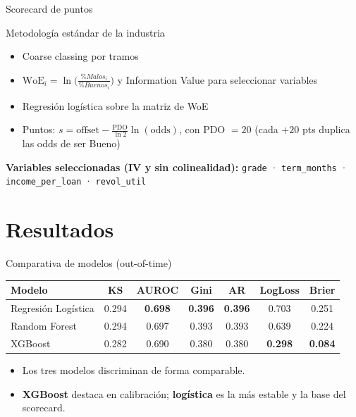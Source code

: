 \documentclass[aspectratio=169, 11pt]{beamer}
\newcommand{\bt}[1]{\textbf{#1}}
\begin{document}
\begin{frame}{Scorecard de puntos}
  \begin{block}{Metodología estándar de la industria}
    \begin{itemize}
      \item Coarse classing por tramos
      \item $\mathrm{WoE}_i = \ln\!\big(\tfrac{\%Malos_i}{\%Buenos_i}\big)$ y
            Information Value para seleccionar variables
      \item Regresión logística sobre la matriz de WoE
      \item Puntos: $s = \text{offset} - \tfrac{\text{PDO}}{\ln 2}
            \ln(\text{odds})$, con PDO $=20$ (cada $+20$ pts duplica las
            odds de ser Bueno)
    \end{itemize}
  \end{block}
  \bt{Variables seleccionadas (IV y sin colinealidad):}
  {\small \texttt{grade} · \texttt{term\_months} · \texttt{income\_per\_loan}
  · \texttt{revol\_util}}
\end{frame}

\section{Resultados}

\begin{frame}{Comparativa de modelos (out-of-time)}
  \begin{table}
    \small
    \begin{tabular}{lcccccc}
      \toprule
      Modelo & KS & AUROC & Gini & AR & LogLoss & Brier \\
      \midrule
      Regresión Logística & 0.294 & \bt{0.698} & \bt{0.396} & \bt{0.396}
             & 0.703 & 0.251 \\
      Random Forest        & 0.294 & 0.697 & 0.393 & 0.393 & 0.639 & 0.224 \\
      XGBoost              & 0.282 & 0.690 & 0.380 & 0.380 & \bt{0.298} & \bt{0.084} \\
      \bottomrule
    \end{tabular}
  \end{table}
  \begin{itemize}
    \item Los tres modelos discriminan de forma comparable.
    \item \bt{XGBoost} destaca en calibración; \bt{logística} es la más
          estable y la base del scorecard.
  \end{itemize}
\end{frame}
\end{document}
